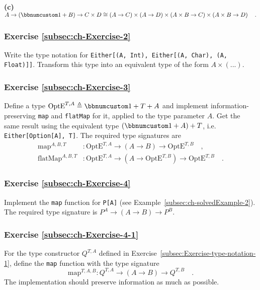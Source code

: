 \textbf{(c)} $A\rightarrow\left(\bbnum 1+B\right)\rightarrow C\times D\cong\left(A\rightarrow C\right)\times\left(A\rightarrow D\right)\times\left(A\times B\rightarrow C\right)\times\left(A\times B\rightarrow D\right)\quad.$

\subsubsection{Exercise \label{subsec:ch-Exercise-2}\ref{subsec:ch-Exercise-2}}

Write the type notation for \lstinline!Either[(A, Int), Either[(A, Char), (A, Float)]]!.
Transform this type into an equivalent type of the form $A\times(...)$.

\subsubsection{Exercise \label{subsec:ch-Exercise-3}\ref{subsec:ch-Exercise-3}}

Define a type $\text{OptE}^{T,A}\triangleq\bbnum 1+T+A$ and implement
information-preserving \lstinline!map! and \lstinline!flatMap! for
it, applied to the type parameter $A$. Get the same result using
the equivalent type $(\bbnum 1+A)+T$, i.e. \lstinline!Either[Option[A], T]!.
The required type signatures are
\begin{align*}
\text{map}^{A,B,T} & :\text{OptE}^{T,A}\rightarrow\left(A\rightarrow B\right)\rightarrow\text{OptE}^{T,B}\quad,\\
\text{flatMap}^{A,B,T} & :\text{OptE}^{T,A}\rightarrow(A\rightarrow\text{OptE}^{T,B})\rightarrow\text{OptE}^{T,B}\quad.
\end{align*}


\subsubsection{Exercise \label{subsec:ch-Exercise-4}\ref{subsec:ch-Exercise-4}}

Implement the \lstinline!map! function for \lstinline!P[A]! (see
Example~\ref{subsec:ch-solvedExample-2}). The required type signature
is $P^{A}\rightarrow\left(A\rightarrow B\right)\rightarrow P^{B}$.

\subsubsection{Exercise \label{subsec:ch-Exercise-4-1}\ref{subsec:ch-Exercise-4-1}}

For the type constructor $Q^{T,A}$ defined in Exercise~\ref{subsec:Exercise-type-notation-1},
define the \lstinline!map! function with the type signature
\[
\text{map}^{T,A,B}:Q^{T,A}\rightarrow\left(A\rightarrow B\right)\rightarrow Q^{T,B}\quad.
\]
The implementation should preserve information as much as possible.

